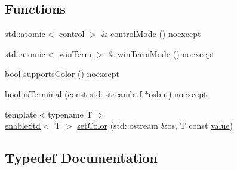 \subsection*{Functions}
\begin{DoxyCompactItemize}
\item 
std\+::atomic$<$ \mbox{\hyperlink{namespacerang_a9a0ad8048ed47f032f5bdb687ba64164}{control}} $>$ \& \mbox{\hyperlink{namespacerang_1_1rang__implementation_a99f6a7aceb4c73be5583199d7c4bf608}{control\+Mode}} () noexcept
\item 
std\+::atomic$<$ \mbox{\hyperlink{namespacerang_af70222b38ecff8fc5aef0958d052b433}{win\+Term}} $>$ \& \mbox{\hyperlink{namespacerang_1_1rang__implementation_a7aeef192943a09050fcb8b635b277c7a}{win\+Term\+Mode}} () noexcept
\item 
bool \mbox{\hyperlink{namespacerang_1_1rang__implementation_a536a3edd1809b7bcda844161c1cb1a05}{supports\+Color}} () noexcept
\item 
bool \mbox{\hyperlink{namespacerang_1_1rang__implementation_af195c8344db945b8027c500cdf835964}{is\+Terminal}} (const std\+::streambuf $\ast$osbuf) noexcept
\item 
{\footnotesize template$<$typename T $>$ }\\\mbox{\hyperlink{namespacerang_1_1rang__implementation_a769f245caecc8bdf2d741f39a48052ac}{enable\+Std}}$<$ T $>$ \mbox{\hyperlink{namespacerang_1_1rang__implementation_adb095d5412fc21b48d0193dfaf29786e}{set\+Color}} (std\+::ostream \&os, T const \mbox{\hyperlink{glad_8h_a7ab00df62abe96de01795dc0d15959db}{value}})
\end{DoxyCompactItemize}


\subsection{Typedef Documentation}
\mbox{\label{namespacerang_1_1rang__implementation_a769f245caecc8bdf2d741f39a48052ac}} 
